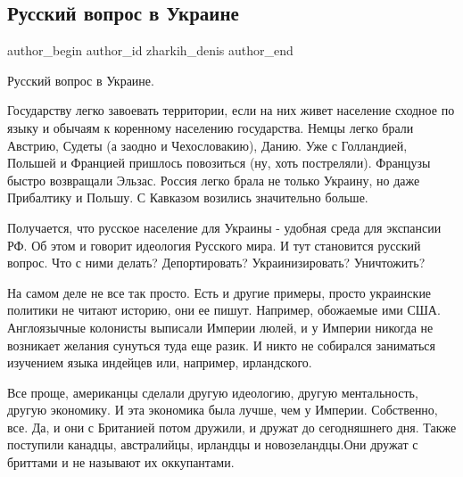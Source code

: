  
 
 
 
 
 
\subsection{Русский вопрос в Украине}
\label{sec:23_10_2021.fb.zharkih_denis.1.russkij_vopros_ukraina}
 
\ifcmt
 author_begin
   author_id zharkih_denis
 author_end
\fi

Русский вопрос в Украине.

Государству легко завоевать территории, если на них живет население сходное по
языку и обычаям к коренному населению государства. Немцы легко брали Австрию,
Судеты (а заодно и Чехословакию), Данию. Уже с Голландией, Польшей и Францией
пришлось повозиться (ну, хоть постреляли). Французы быстро возвращали Эльзас.
Россия легко брала не только Украину, но даже Прибалтику и Польшу. С Кавказом
возились значительно больше. 

Получается, что русское население для Украины -  удобная среда для экспансии
РФ. Об этом и говорит идеология Русского мира. И тут становится русский вопрос.
Что с ними делать? Депортировать? Украинизировать? Уничтожить?

На самом деле не все так просто. Есть и другие примеры, просто украинские
политики не читают историю, они ее пишут. Например, обожаемые ими США.
Англоязычные колонисты выписали Империи люлей, и у Империи никогда не возникает
желания сунуться туда еще разик. И никто не собирался заниматься изучением
языка индейцев или, например, ирландского. 

Все проще, американцы сделали другую идеологию, другую ментальность, другую
экономику. И эта экономика была лучше, чем у Империи. Собственно, все. Да, и
они с Британией потом дружили, и дружат до сегодняшнего дня. Также поступили
канадцы, австралийцы, ирландцы и новозеландцы.Они дружат с бриттами и не
называют их оккупантами. 

